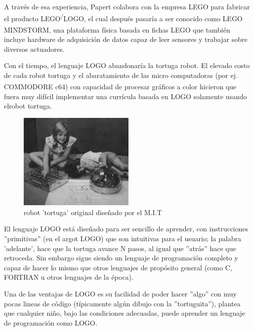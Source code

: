 A través de esa experiencia, Papert colabora con la empresa LEGO para fabricar el producto LEGO\textsuperscript/LOGO, el cual después pasaría a ser conocido como LEGO MINDSTORM\textsuperscript{\texttrademark}, una plataforma física basada en fichas LEGO\textsuperscript{\textregistered} que también incluye hardware de adquisición de datos capaz de leer sensores y trabajar sobre diversos actuadores.

Con el tiempo, el lenguaje LOGO abandonaría la tortuga robot. El elevado costo de cada robot tortuga y el abaratamiento de las micro computadoras (por ej. COMMODORE\textsuperscript{\textregistered} c64) con capacidad de procesar gráficos a color  hicieron que fuera muy difícil implementar una currícula basada en LOGO solamente usando elrobot tortuga.

\begin{figure}
  \begin{center}
    \includegraphics[width=0.5\textwidth]{figuras/logo_robot.jpg}
    \caption[Caption for LOF]{robot 'tortuga' original diseñado por el M.I.T}
    
    \label{fig:tortuga_mit}
  \end{center}
\end{figure}

El lenguaje LOGO está diseñado para ser sencillo de aprender, con instrucciones ''primitivas'' (en el argot LOGO) que son intuitivas para el usuario; la palabra 'adelante', hace que la tortuga avance N pasos,  al igual que ''atrás'' hace que retroceda. Sin embargo sigue siendo un lenguaje de programación completo y capaz de hacer lo mismo que otros lenguajes de propósito general  (como C, FORTRAN u otros lenguajes de la época). 

Una de las ventajas de LOGO es su facilidad de poder hacer ''algo'' con muy pocas lineas de código (típicamente algún dibujo con la ''tortuguita''), \cite{seymour_papert_desafio_1987} plantea que cualquier niño, bajo las condiciones adecuadas, puede aprender un lenguaje de programación como LOGO.

